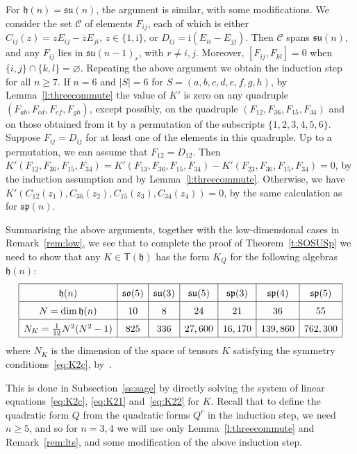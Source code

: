 \documentclass[10pt,a4paper]{amsart}
\newcommand \cC{\mathcal{C}}
\newcommand \sT{\mathsf{T}}
\newcommand\h{\mathfrak h}
\newcommand \so{\mathfrak{so}}
\newcommand \spg{\mathfrak{sp}}
\newcommand \su{\mathfrak{su}}
\newcommand \ir{\mathrm{i}}
\newcommand \<{\langle}
\renewcommand \>{\rangle}
\begin{document}
	For $\h(n) = \su(n)$, the argument is similar, with some modifications. We consider the set $\cC$ of elements $F_{ij}$, each of which is either $C_{ij}(z) = z E_{ij} - \overline{z} E_{ji},\, z \in \{1,\ir\}$, or $D_{ij} = \ir (E_{ii}-E_{jj})$. Then $\cC$ spans $\su(n)$, and any $F_{ij}$ lies in $\su(n-1)_r$, with $r \ne i,j$. Moreover, $[F_{ij},F_{kl}] = 0$ when $\{i,j\} \cap \{k,l\} = \varnothing$. Repeating the above argument we obtain the induction step for all $n \ge 7$. If $n=6$ and $|S|=6$ for $S=(a,b,c,d,e,f,g,h)$, by Lemma~\ref{l:threecommute} the value of $K'$ is zero on any quadruple $(F_{ab},F_{cd},F_{ef},F_{gh})$, except possibly, on the quadruple $(F_{12},F_{36},F_{15},F_{34})$ and on those obtained from it by a permutation of the subscripts $\{1,2,3,4,5,6\}$. Suppose $F_{ij}=D_{ij}$ for at least one of the elements in this quadruple. Up to a permutation, we can assume that $F_{12}=D_{12}$. Then $K'(F_{12},F_{36},F_{15},F_{34}) = K'(F_{13},F_{36},F_{15},F_{34}) - K'(F_{23},F_{36},F_{15},F_{34}) = 0$, by the induction assumption and by Lemma~\ref{l:threecommute}. Otherwise, we have $K'(C_{12}(z_1),C_{36}(z_2),C_{15}(z_3),C_{34}(z_4)) = 0$, by the same calculation as for $\spg(n)$.
	
	\smallskip
	
	Summarising the above arguments, together with the low-dimensional cases in Remark~\ref{rem:low}, we see that to complete the proof of Theorem~\ref{t:SOSUSp} we need to show that any $K \in \sT(\h)$ has the form $K_Q$ for the following algebras $\h(n)$:
	\begin{equation} \label{eq:remain}
    {
    \renewcommand{\arraystretch}{1.5}
	\begin{array}{|c|c|c|c|c|c|c|}
    \hline
    \h(n) & \so(5) & \su(3) & \su(5) & \spg(3) & \spg(4) & \spg(5) \\
    \hline
    N=\dim \h(n) & 10 & 8 & 24 & 21 & 36 & 55 \\
    \hline
    N_K = \frac{1}{12}N^2 (N^2-1) & 825 & 336 & 27,600 & 16,170 & 139,860 & 762,300 \\
    \hline
    \end{array}
    }
	\end{equation}
where $N_K$ is the dimension of the space of tensors $K$ satisfying the symmetry conditions~\eqref{eq:K2c}, by~\cite[Remark~3]{MN2}.

	This is done in Subsection~\ref{ss:sage} by directly solving the system of linear equations~\eqref{eq:K2c}, \eqref{eq:K21} and~\eqref{eq:K22} for $K$. Recall that to define the quadratic form $Q$ from the quadratic forms $Q^r$ in the induction step, we need $n \ge 5$, and so for $n=3,4$ we will use only Lemma~\ref{l:threecommute} and Remark~\ref{rem:lts}, and some modification of the above induction step.
	
\end{document}
